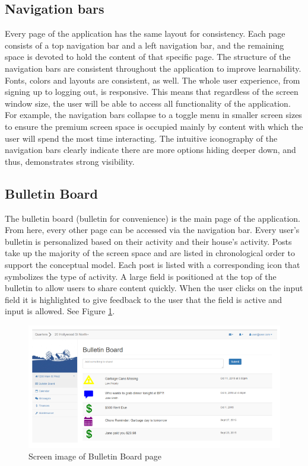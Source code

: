 \documentclass[12pt]{article}
\begin{document}
\subsection{Navigation bars}
Every page of the application has the same layout for consistency. Each page consists of a top navigation bar and a left navigation bar, and the remaining space is devoted to hold the content of that specific page. The structure of the navigation bars are consistent throughout the application to improve learnability. Fonts, colors and layouts are consistent, as well. The whole user experience, from signing up to logging out, is responsive. This means that regardless of the screen window size, the user will be able to access all functionality of the application. For example, the navigation bars collapse to a toggle menu in smaller screen sizes to ensure the premium screen space is occupied mainly by content with which the user will spend the most time interacting. The intuitive iconography of the navigation bars clearly indicate there are more options hiding deeper down, and thus, demonstrates strong visibility.

\subsection{Bulletin Board}
The bulletin board (bulletin for convenience) is the main page of the application. From here, every other page can be accessed via the navigation bar. Every user's bulletin is personalized based on their activity and their house's activity. Posts take up the majority of the screen space and are listed in chronological order to support the conceptual model. Each post is listed with a corresponding icon that symbolizes the type of activity. A large field is positioned at the top of the bulletin to allow users to share content quickly. When the user clicks on the input field it is highlighted to give feedback to the user that the field is active and input is allowed. See Figure \ref{fig:bulletin}.

\begin{figure}[h]
\centering
\includegraphics[width=\textwidth]{bulletin}
\caption{Screen image of Bulletin Board page}
\label{fig:bulletin}
\end{figure}
\end{document}
